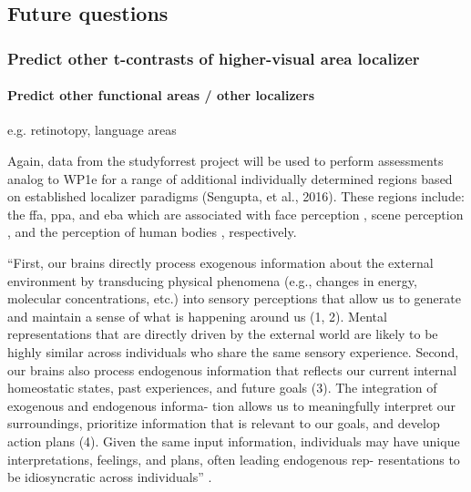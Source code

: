 \subsection{Future questions}

\subsubsection{Predict other t-contrasts of higher-visual area localizer}


\paragraph{Predict other functional areas / other localizers}


e.g. retinotopy, language areas

%
Again, data from the studyforrest project will be used to perform assessments
analog to WP1e for a range of additional individually determined regions based
on established localizer paradigms (Sengupta, et al., 2016).
%
These regions include: the \ac{ffa}, \ac{ppa}, and \ac{eba}  which are
associated with face perception \citep{kanwisher1997ffa,
pitcher2011occipitalfacearea}, scene perception \citep{epstein1998ppa}, and the
perception of human bodies \citep{downing2001bodyarea}, respectively.

``First, our brains directly process exogenous information about the external
environment by transducing physical phenomena (e.g., changes in energy,
molecular concentrations, etc.) into sensory perceptions that allow us to
generate and maintain a sense of what is happening around us (1, 2). Mental
representations that are directly driven by the external world are likely to be
highly similar across individuals who share the same sensory experience. Second,
our brains also process endogenous information that reflects our current
internal homeostatic states, past experiences, and future goals (3). The
integration of exogenous and endogenous informa- tion allows us to meaningfully
interpret our surroundings, prioritize information that is relevant to our
goals, and develop action plans (4). Given the same input information,
individuals may have unique interpretations, feelings, and plans, often leading
endogenous rep- resentations to be idiosyncratic across individuals''
\citep{chang2021endogenous}.

